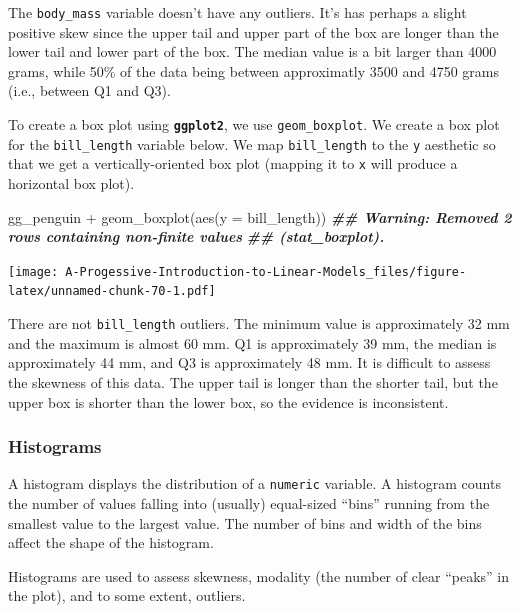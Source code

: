 \documentclass[
]{book}
\newenvironment{Shaded}{\begin{snugshade}}{\end{snugshade}}
\newcommand{\AttributeTok}[1]{\textcolor[rgb]{0.77,0.63,0.00}{#1}}
\newcommand{\DocumentationTok}[1]{\textcolor[rgb]{0.56,0.35,0.01}{\textbf{\textit{#1}}}}
\newcommand{\FunctionTok}[1]{\textcolor[rgb]{0.00,0.00,0.00}{#1}}
\newcommand{\NormalTok}[1]{#1}
\newcommand{\SpecialCharTok}[1]{\textcolor[rgb]{0.00,0.00,0.00}{#1}}
\theoremstyle{definition}
\theoremstyle{definition}
\theoremstyle{definition}
\theoremstyle{definition}
\theoremstyle{remark}
\begin{document}
The \texttt{body\_mass} variable doesn't have any outliers. It's has perhaps a slight positive skew since the upper tail and upper part of the box are longer than the lower tail and lower part of the box. The median value is a bit larger than 4000 grams, while 50\% of the data being between approximatly 3500 and 4750 grams (i.e., between Q1 and Q3).

To create a box plot using \textbf{\texttt{ggplot2}}, we use \texttt{geom\_boxplot}. We create a box plot for the \texttt{bill\_length} variable below. We map \texttt{bill\_length} to the \texttt{y} aesthetic so that we get a vertically-oriented box plot (mapping it to \texttt{x} will produce a horizontal box plot).

\begin{Shaded}
\begin{Highlighting}[]
\NormalTok{gg\_penguin }\SpecialCharTok{+} \FunctionTok{geom\_boxplot}\NormalTok{(}\FunctionTok{aes}\NormalTok{(}\AttributeTok{y =}\NormalTok{ bill\_length))}
\DocumentationTok{\#\# Warning: Removed 2 rows containing non{-}finite values}
\DocumentationTok{\#\# (stat\_boxplot).}
\end{Highlighting}
\end{Shaded}

\texttt{[image: A-Progessive-Introduction-to-Linear-Models\_files/figure-latex/unnamed-chunk-70-1.pdf]}

There are not \texttt{bill\_length} outliers. The minimum value is approximately 32 mm and the maximum is almost 60 mm. Q1 is approximately 39 mm, the median is approximately 44 mm, and Q3 is approximately 48 mm. It is difficult to assess the skewness of this data. The upper tail is longer than the shorter tail, but the upper box is shorter than the lower box, so the evidence is inconsistent.

\hypertarget{histograms}{%
\subsubsection{Histograms}\label{histograms}}

A histogram displays the distribution of a \texttt{numeric} variable. A histogram counts the number of values falling into (usually) equal-sized ``bins'' running from the smallest value to the largest value. The number of bins and width of the bins affect the shape of the histogram.

Histograms are used to assess skewness, modality (the number of clear ``peaks'' in the plot), and to some extent, outliers.
\end{document}
